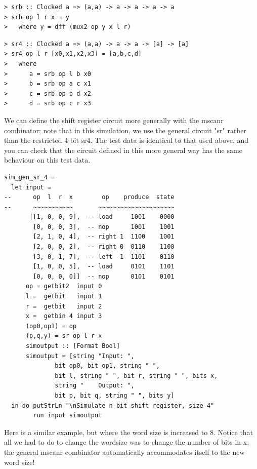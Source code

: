\documentclass[a4paper,openany,fleqn]{book}
\begin{document}
\begin{verbatim}
> srb :: Clocked a => (a,a) -> a -> a -> a -> a
> srb op l r x = y
>   where y = dff (mux2 op y x l r)
\end{verbatim}

\begin{verbatim}
> sr4 :: Clocked a => (a,a) -> a -> a -> [a] -> [a]
> sr4 op l r [x0,x1,x2,x3] = [a,b,c,d]
>   where
>      a = srb op l b x0
>      b = srb op a c x1
>      c = srb op b d x2
>      d = srb op c r x3
\end{verbatim}

We can define the shift register circuit more generally with the
mscanr combinator; note that in this simulation, we use the general
circuit "sr" rather than the restricted 4-bit sr4.  The test data
is identical to that used above, and you can check that the circuit
defined in this more general way has the same behaviour on this
test data.

\begin{verbatim}
sim_gen_sr_4 =
  let input =
--      op  l  r  x        op    produce  state
--      ~~~~~~~~~~~       ~~~~~~~~~~~~~~~~~~~~~
       [[1, 0, 0, 9],  -- load     1001    0000
        [0, 0, 0, 3],  -- nop      1001    1001
        [2, 1, 0, 4],  -- right 1  1100    1001
        [2, 0, 0, 2],  -- right 0  0110    1100
        [3, 0, 1, 7],  -- left  1  1101    0110
        [1, 0, 0, 5],  -- load     0101    1101
        [0, 0, 0, 0]]  -- nop      0101    0101
      op = getbit2  input 0
      l =  getbit   input 1
      r =  getbit   input 2
      x =  getbin 4 input 3
      (op0,op1) = op
      (p,q,y) = sr op l r x
      simoutput :: [Format Bool]
      simoutput = [string "Input: ",
              bit op0, bit op1, string " ",
              bit l, string " ", bit r, string " ", bits x,
              string "    Output: ",
              bit p, bit q, string " ", bits y]
  in do putStrLn "\nSimulate n-bit shift register, size 4"
        run input simoutput
\end{verbatim}

Here is a similar example, but where the word size is increased to
8.  Notice that all we had to do to change the wordsize was to
change the number of bits in x; the general mscanr combinator
automatically accommodates itself to the new word size!
\end{document}
